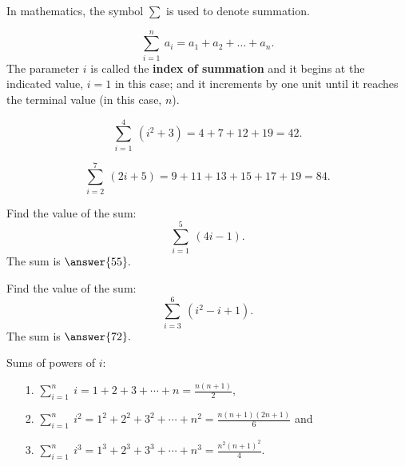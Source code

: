 \documentclass{ximera}
\begin{document}
In mathematics, the symbol $\sum$ is used to denote summation.
\begin{definition}
\[\sum_{i = 1}^n \ a_i = a_1 + a_2 + \dots + a_n.\]
The parameter $i$ is called the \textbf{index of summation} and it begins at the indicated value, $i=1$ in this case; 
and it increments by one unit until it reaches the terminal value (in this case, $n$).
\end{definition}

\begin{example}
\[\sum_{i = 1}^4 \ (i^2 + 3) = 4 + 7 + 12 + 19 = 42.\]
\end{example}

\begin{example}
\[\sum_{i = 2}^7 \ (2i +5) = 9 + 11 + 13 + 15 + 17 + 19 = 84.\]
\end{example}

\begin{problem}
Find the value of the sum:
\[\sum_{i = 1}^5 \ (4i -1).\]
The sum is $\answer{55}.$
\end{problem}

\begin{problem}
Find the value of the sum:
\[\sum_{i = 3}^6 \ (i^2 - i + 1).\]
The sum is $\answer{72}.$
\end{problem}


\begin{theorem} Sums of powers of $i$:



\begin{itemize}
\item[1.] $\displaystyle{\sum_{i = 1}^n \ i = 1 + 2 + 3+ \cdots + n = \frac{n(n+1)}{2}},$
\item[2.] $\displaystyle{\sum_{i = 1}^n \ i^2 = 1^2 + 2^2 + 3^2 + \cdots + n^2 = \frac{n(n+1)(2n+1)}{6}}$ and
\item[3.] $\displaystyle{\sum_{i = 1}^n \ i^3 = 1^3 + 2^3+ 3^3 + \cdots + n^3 = \frac{n^2(n+1)^2}{4}}$.
\end{itemize}
\end{theorem}
\end{document}
